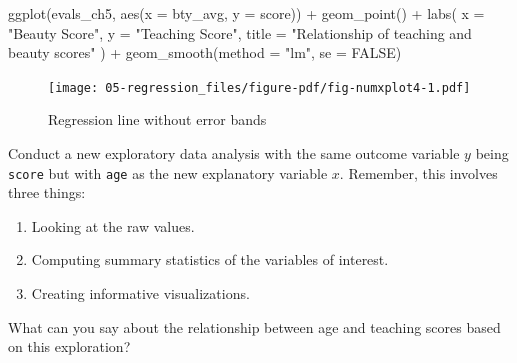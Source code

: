 \documentclass[
  letterpaper,
  DIV=11,
  numbers=noendperiod]{scrreprt}
\newenvironment{Shaded}{\begin{snugshade}}{\end{snugshade}}
\newcommand{\AttributeTok}[1]{\textcolor[rgb]{0.40,0.45,0.13}{#1}}
\newcommand{\ConstantTok}[1]{\textcolor[rgb]{0.56,0.35,0.01}{#1}}
\newcommand{\FunctionTok}[1]{\textcolor[rgb]{0.28,0.35,0.67}{#1}}
\newcommand{\NormalTok}[1]{\textcolor[rgb]{0.00,0.23,0.31}{#1}}
\newcommand{\SpecialCharTok}[1]{\textcolor[rgb]{0.37,0.37,0.37}{#1}}
\newcommand{\StringTok}[1]{\textcolor[rgb]{0.13,0.47,0.30}{#1}}
\providecommand{\tightlist}{%
  \setlength{\itemsep}{0pt}\setlength{\parskip}{0pt}}\usepackage{longtable,booktabs,array}
\theoremstyle{definition}
\theoremstyle{remark}
\begin{document}
\begin{Shaded}
\begin{Highlighting}[]
\FunctionTok{ggplot}\NormalTok{(evals\_ch5, }\FunctionTok{aes}\NormalTok{(}\AttributeTok{x =}\NormalTok{ bty\_avg, }\AttributeTok{y =}\NormalTok{ score)) }\SpecialCharTok{+}
  \FunctionTok{geom\_point}\NormalTok{() }\SpecialCharTok{+}
  \FunctionTok{labs}\NormalTok{(}
    \AttributeTok{x =} \StringTok{"Beauty Score"}\NormalTok{, }
    \AttributeTok{y =} \StringTok{"Teaching Score"}\NormalTok{, }
    \AttributeTok{title =} \StringTok{"Relationship of teaching and beauty scores"}
\NormalTok{    ) }\SpecialCharTok{+}
  \FunctionTok{geom\_smooth}\NormalTok{(}\AttributeTok{method =} \StringTok{"lm"}\NormalTok{, }\AttributeTok{se =} \ConstantTok{FALSE}\NormalTok{)}
\end{Highlighting}
\end{Shaded}

\begin{figure}[H]

{\centering \texttt{[image: 05-regression\_files/figure-pdf/fig-numxplot4-1.pdf]}

}

\caption{\label{fig-numxplot4}Regression line without error bands}

\end{figure}

\begin{tcolorbox}[enhanced jigsaw, coltitle=black, toprule=.15mm, bottomtitle=1mm, breakable, leftrule=.75mm, title={{🎯} Learning Check 5.1}, opacitybacktitle=0.6, colback=white, rightrule=.15mm, opacityback=0, toptitle=1mm, colbacktitle=quarto-callout-tip-color!10!white, colframe=quarto-callout-tip-color-frame, titlerule=0mm, arc=.35mm, bottomrule=.15mm, left=2mm]
Conduct a new exploratory data analysis with the same outcome variable
\(y\) being \texttt{score} but with \texttt{age} as the new explanatory
variable \(x\). Remember, this involves three things:

\begin{enumerate}
\def\labelenumi{\alph{enumi})}
\tightlist
\item
  Looking at the raw values.
\item
  Computing summary statistics of the variables of interest.
\item
  Creating informative visualizations.
\end{enumerate}

What can you say about the relationship between age and teaching scores
based on this exploration?
\end{tcolorbox}
\end{document}
